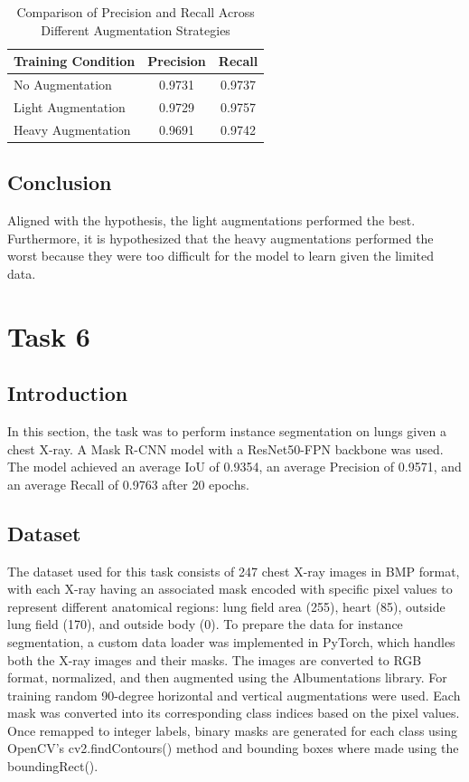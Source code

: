 \documentclass[10pt,twocolumn,letterpaper]{article}
\begin{document}
\begin{table}[h!]
\centering
\begin{tabular}{l|c|c|}
\hline
\bf{Training Condition} & \bf{Precision} & \bf{Recall} \\ \hline
No Augmentation & 0.9731 & 0.9737 \\ \hline
Light Augmentation & 0.9729 & 0.9757 \\ \hline
Heavy Augmentation & 0.9691 & 0.9742 \\ \hline
\end{tabular}
\caption{Comparison of Precision and Recall Across Different Augmentation Strategies}
\label{tab:precision_recall_results}
\end{table}


\subsection{Conclusion}
Aligned with the hypothesis, the light augmentations performed the best. Furthermore, it is hypothesized that the heavy augmentations performed the worst because they were too difficult for the model to learn given the limited data.
\newpage

\section{Task 6}

\subsection{Introduction}
In this section, the task was to perform instance segmentation on lungs given a chest X-ray. A Mask R-CNN model with a ResNet50-FPN backbone was used. The model achieved an average IoU of 0.9354, an average Precision of 0.9571, and an average Recall of 0.9763 after 20 epochs.

\subsection{Dataset}
The dataset used for this task \cite{DatasetForClass} consists of 247 chest X-ray images in BMP format, with each X-ray having an associated mask encoded with specific pixel values to represent different anatomical regions: lung field area (255), heart (85), outside lung field (170), and outside body (0). To prepare the data for instance segmentation, a custom data loader was implemented in PyTorch, which handles both the X-ray images and their masks. The images are converted to RGB format, normalized, and then augmented using the Albumentations library. For training random 90-degree horizontal and vertical augmentations were used. Each mask was converted into its corresponding class indices based on the pixel values. Once remapped to integer labels, binary masks are generated for each class using OpenCV's cv2.findContours() method and bounding boxes where made using the boundingRect().
\end{document}
